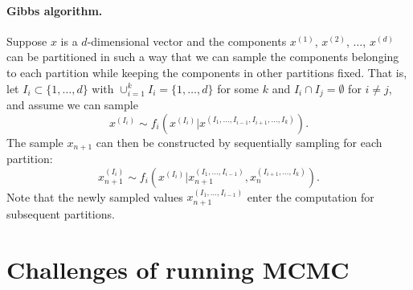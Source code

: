 \documentclass[12pt,a4paper]{report}
\begin{document}

\paragraph{Gibbs algorithm.} Suppose $x$ is a $d$-dimensional vector and the components $x^{(1)}$, $x^{(2)}$, $\dots$, $x^{(d)}$ can be partitioned in such a way that we can sample the components belonging to each partition while keeping the components in other partitions fixed. That is, let $I_i \subset \{1, \dots, d\}$ with $\cup_{i=1}^k I_i = \{1, \dots, d\}$ for some $k$ and $I_i \cap I_j = \emptyset$ for $i \neq j$, and assume we can sample
$$x^{(I_i)} \sim f_i\left(x^{(I_i)} | x^{(I_1, \dots, I_{i-1}, I_{i+1}, \dots, I_k)}\right).$$
The sample $x_{n+1}$ can then be constructed by sequentially sampling for each partition:
$$x_{n+1}^{(I_i)} \sim f_i\left(x^{(I_i)} | x_{n+1}^{(I_1, \dots, I_{i-1})}, x_n^{(I_{i+1}, \dots, I_k)}\right).$$
Note that the newly sampled values $x_{n+1}^{(I_1, \dots, I_{i-1})}$ enter the computation for subsequent partitions.




\section{Challenges of running MCMC}
\end{document}
